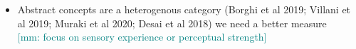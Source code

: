 \documentclass[12pt,letterpaper,table,svgnames,dvipsnames]{article}
\newcommand{\NB}[1]{\textcolor{Purple}{Note to self: #1}}
\newcommand{\mm}[1]{\textcolor{teal}{[mm: #1]}}
\begin{document}
\begin{itemize}
\begin{itemize}
\begin{itemize}
                    \item  Abstract concepts are a heterogenous category (Borghi et al 2019; Villani et al 2019; Muraki et al 2020; Desai et al 2018) we need a better measure \\
                    \mm{focus on sensory experience or perceptual strength}











                \end{itemize}
        \end{itemize}

\end{itemize}





\end{document}
